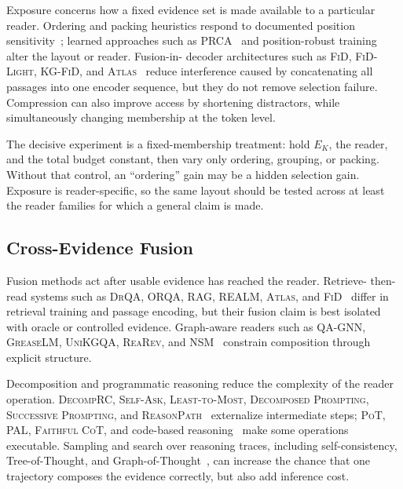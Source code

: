 \documentclass[manuscript,review]{acmart}
\theoremstyle{definition}
\theoremstyle{plain}
\theoremstyle{remark}
\begin{document}
Exposure concerns how a fixed evidence set is made available to a particular
reader. Ordering and packing heuristics respond to documented position
sensitivity~\cite{liu2024lostmiddle,bai2024longbench,yen2024lcontext}; learned
approaches such as \textsc{PRCA}~\cite{yang2023prca} and position-robust
training~\cite{he2024positionrobust} alter the layout or reader. Fusion-in-
decoder architectures such as \textsc{FiD}, \textsc{FiD-Light},
\textsc{KG-FiD}, and \textsc{Atlas}~\cite{izacard2021fid,hofstatter2023fidlight,yu2022kgfid,izacard2022atlas}
reduce interference caused by concatenating all passages into one encoder
sequence, but they do not remove selection failure. Compression can also
improve access by shortening distractors, while simultaneously changing
membership at the token level.

The decisive experiment is a fixed-membership treatment: hold $E_K$, the
reader, and the total budget constant, then vary only ordering, grouping, or
packing. Without that control, an ``ordering'' gain may be a hidden selection
gain. Exposure is reader-specific, so the same layout should be tested across
at least the reader families for which a general claim is made.

\subsection{Cross-Evidence Fusion}
\label{subsec:methods_fusion}

Fusion methods act after usable evidence has reached the reader. Retrieve-
then-read systems such as \textsc{DrQA}, \textsc{ORQA}, \textsc{RAG},
\textsc{REALM}, \textsc{Atlas}, and \textsc{FiD}~\cite{chen2017drqa,lee2019orqa,lewis2020rag,guu2020realm,izacard2022atlas,izacard2021fid}
differ in retrieval training and passage encoding, but their fusion claim is
best isolated with oracle or controlled evidence. Graph-aware readers such as
\textsc{QA-GNN}, \textsc{GreaseLM}, \textsc{UniKGQA},
\textsc{ReaRev}, and \textsc{NSM}~\cite{yasunaga2021qagnn,zhang2022greaselm,jiang2023unikgqa,mavromatis2022rearev,he2021nsm}
constrain composition through explicit structure.

Decomposition and programmatic reasoning reduce the complexity of the reader
operation. \textsc{DecompRC}, \textsc{Self-Ask},
\textsc{Least-to-Most}, \textsc{Decomposed Prompting},
\textsc{Successive Prompting}, and \textsc{ReasonPath}~\cite{min2019decomprc,press2022selfask,zhou2023leasttomost,khot2023decomposed,dua2022successive,li2023reasonpath}
externalize intermediate steps; \textsc{PoT}, \textsc{PAL},
\textsc{Faithful CoT}, and code-based reasoning~\cite{chen2023pot,gao2023pal,lyu2023faithfulcot,wang2024executable}
make some operations executable. Sampling and search over reasoning traces,
including self-consistency, Tree-of-Thought, and Graph-of-Thought~\cite{wang2023selfconsistency,yao2023tot,besta2024got},
can increase the chance that one trajectory composes the evidence correctly,
but also add inference cost.
\end{document}
